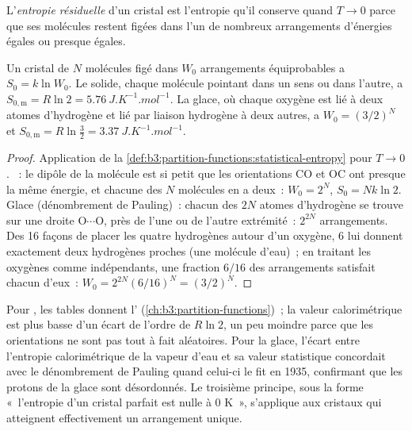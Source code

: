 \begin{definition}\label{def:b3:statistical-thermo-applied:residual-entropy}
L'\emph{entropie résiduelle} d'un cristal est l'entropie
qu'il conserve quand $T \to 0$ parce que ses molécules restent figées
dans l'un de nombreux arrangements d'énergies égales ou presque égales.
\end{definition}

\begin{proposition}\label{prop:b3:statistical-thermo-applied:residual}
Un cristal de $N$ molécules figé dans $W_0$ arrangements équiprobables a
$S_0 =
k\ln W_0$. Le  solide, chaque molécule pointant dans un sens ou
dans l'autre, a $S_{0,\mathrm m} = R\ln2 =
\qty{5.76}{J.K^{-1}.mol^{-1}}$. La glace, où chaque oxygène est lié à
deux atomes d'hydrogène et lié par liaison hydrogène à deux autres, a
$W_0 = (3/2)^N$ et $S_{0,\mathrm m} = R\ln\frac32 =
\qty{3.37}{J.K^{-1}.mol^{-1}}$.
\end{proposition}

\begin{proof}
Application de la \cref{def:b3:partition-functions:statistical-entropy}
pour $T \to 0$.
~: le dipôle de la molécule est si petit que les orientations CO
et OC ont presque la même énergie, et chacune des $N$ molécules en a
deux~: $W_0 = 2^N$,
$S_0 = Nk\ln2$. Glace (dénombrement de Pauling)~: chacun des $2N$ atomes
d'hydrogène se trouve sur une droite
O$\cdots$O, près de l'une ou de l'autre extrémité~: $2^{2N}$
arrangements. Des 16 façons de placer les quatre hydrogènes autour d'un
oxygène, 6 lui donnent exactement deux hydrogènes proches (une molécule
d'eau)~; en traitant les oxygènes comme indépendants, une fraction
$6/16$ des arrangements satisfait chacun d'eux~: $W_0 = 2^{2N}(6/16)^N = (3/2)^N$.
\end{proof}

Pour , les tables donnent l'
(\cref{ch:b3:partition-functions})~; la valeur calorimétrique est plus
basse d'un écart de l'ordre de $R\ln2$, un peu moindre parce que les
orientations ne sont pas tout à fait aléatoires. Pour la glace, l'écart
entre l'entropie calorimétrique de la vapeur d'eau et sa valeur
statistique concordait avec le dénombrement de Pauling quand celui-ci le
fit en 1935, confirmant que les protons de la glace sont désordonnés. Le
troisième principe, sous la forme «~l'entropie d'un cristal parfait est
nulle à 0 K~», s'applique aux cristaux qui atteignent effectivement un
arrangement unique.

